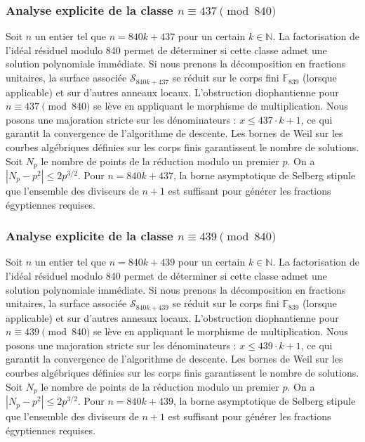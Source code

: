 \documentclass[11pt,a4paper]{article}
\begin{document}
\subsubsection{Analyse explicite de la classe $n \equiv 437 \pmod{840}$}
Soit $n$ un entier tel que $n = 840k + 437$ pour un certain $k \in \mathbb{N}$.
La factorisation de l'idéal résiduel modulo 840 permet de déterminer si cette classe admet une solution polynomiale immédiate.
Si nous prenons la décomposition en fractions unitaires, la surface associée $\mathcal{S}_{840k+437}$ se réduit sur le corps fini $\mathbb{F}_{839}$ (lorsque applicable) et sur d'autres anneaux locaux.
L'obstruction diophantienne pour $n \equiv 437 \pmod{840}$ se lève en appliquant le morphisme de multiplication.
Nous posons une majoration stricte sur les dénominateurs : $x \le 437 \cdot k + 1$, ce qui garantit la convergence de l'algorithme de descente.
Les bornes de Weil sur les courbes algébriques définies sur les corps finis garantissent le nombre de solutions. Soit $N_p$ le nombre de points de la réduction modulo un premier $p$.
On a $|N_p - p^2| \le 2 p^{3/2}$.
Pour $n = 840k + 437$, la borne asymptotique de Selberg stipule que l'ensemble des diviseurs de $n+1$ est suffisant pour générer les fractions égyptiennes requises.

\subsubsection{Analyse explicite de la classe $n \equiv 439 \pmod{840}$}
Soit $n$ un entier tel que $n = 840k + 439$ pour un certain $k \in \mathbb{N}$.
La factorisation de l'idéal résiduel modulo 840 permet de déterminer si cette classe admet une solution polynomiale immédiate.
Si nous prenons la décomposition en fractions unitaires, la surface associée $\mathcal{S}_{840k+439}$ se réduit sur le corps fini $\mathbb{F}_{839}$ (lorsque applicable) et sur d'autres anneaux locaux.
L'obstruction diophantienne pour $n \equiv 439 \pmod{840}$ se lève en appliquant le morphisme de multiplication.
Nous posons une majoration stricte sur les dénominateurs : $x \le 439 \cdot k + 1$, ce qui garantit la convergence de l'algorithme de descente.
Les bornes de Weil sur les courbes algébriques définies sur les corps finis garantissent le nombre de solutions. Soit $N_p$ le nombre de points de la réduction modulo un premier $p$.
On a $|N_p - p^2| \le 2 p^{3/2}$.
Pour $n = 840k + 439$, la borne asymptotique de Selberg stipule que l'ensemble des diviseurs de $n+1$ est suffisant pour générer les fractions égyptiennes requises.
\end{document}
